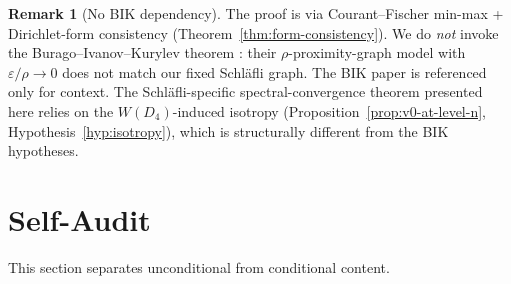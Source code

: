 \documentclass[11pt, a4paper]{amsart}
\theoremstyle{definition}
\newtheorem{remark}[theorem]{Remark}
\begin{document}
\begin{remark}[No BIK dependency]
\label{rmk:no-bik}
The proof is via Courant--Fischer min-max + Dirichlet-form
consistency (Theorem~\ref{thm:form-consistency}). We do
\emph{not} invoke the Burago--Ivanov--Kurylev theorem
\cite{BuragoIvanovKurylev}: their $\rho$-proximity-graph model
with $\varepsilon/\rho \to 0$ does not match our fixed
Schl\"{a}fli graph. The BIK paper is referenced only for
context. The Schl\"{a}fli-specific spectral-convergence theorem
presented here relies on the $W(D_4)$-induced isotropy
(Proposition~\ref{prop:v0-at-level-n},
Hypothesis~\ref{hyp:isotropy}), which is structurally different
from the BIK hypotheses.
\end{remark}

\section{Self-Audit}
\label{sec:audit}

This section separates unconditional from conditional content.
\end{document}
